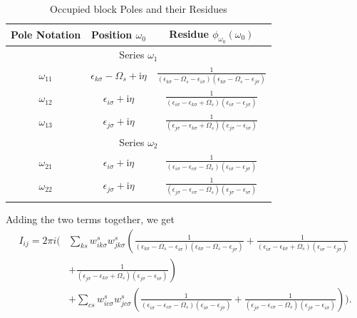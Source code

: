 \documentclass[12pt]{caltech_thesis}
\begin{document}
\begin{table}[h]
\centering
\caption{Occupied block Poles and their Residues}
\begin{tabular}{|c|c|c|}
\hline
Pole Notation & Position $\omega_0$ & Residue $\phi_{\omega_0}(\omega_0)$ \\
\hline
\multicolumn{3}{|c|}{Series $\omega_1$} \\
\hline
$\omega_{11}$ & $\epsilon_{k \sigma} - \Omega_s + \mathrm{i} \eta$ & $\frac{1}{(\epsilon_{k \sigma} - \Omega_s -\epsilon_{i \sigma})(\epsilon_{k \sigma} - \Omega_s -\epsilon_{j \sigma})}$ \\
$\omega_{12}$ & $\epsilon_{i \sigma} + \mathrm{i} \eta$ & $\frac{1}{(\epsilon_{i \sigma} -\epsilon_{k \sigma}+\Omega_s)(\epsilon_{i \sigma} -\epsilon_{j \sigma})}$ \\
$\omega_{13}$ & $\epsilon_{j \sigma} + \mathrm{i} \eta$ & $\frac{1}{(\epsilon_{j \sigma} -\epsilon_{k \sigma}+\Omega_s)(\epsilon_{j \sigma} -\epsilon_{i \sigma})}$ \\
\hline
\multicolumn{3}{|c|}{Series $\omega_2$} \\
\hline
$\omega_{21}$ & $\epsilon_{i \sigma} + \mathrm{i} \eta$ & $\frac{1}{(\epsilon_{i \sigma} -\epsilon_{c \sigma}-\Omega_s)(\epsilon_{i \sigma} -\epsilon_{j \sigma})}$ \\
$\omega_{22}$ & $\epsilon_{j \sigma} + \mathrm{i} \eta$ & $\frac{1}{(\epsilon_{j \sigma} -\epsilon_{c \sigma}-\Omega_s)(\epsilon_{j \sigma} -\epsilon_{i \sigma})}$ \\
\hline
\label{tabpoles_residues_occupied}
\end{tabular}
\end{table}
Adding the two terms together, we get
\begin{equation}
\begin{aligned}
I_{ij} = 2\pi i \Bigg( & \sum_{ks} w_{i k \sigma}^s w_{j k \sigma}^s \left( \frac{1}{(\epsilon_{k \sigma} - \Omega_s - \epsilon_{i \sigma})(\epsilon_{k \sigma} - \Omega_s - \epsilon_{j \sigma})} + \frac{1}{(\epsilon_{i \sigma} - \epsilon_{k \sigma} + \Omega_s)(\epsilon_{i \sigma} - \epsilon_{j \sigma})} \right. \\
& \left. + \frac{1}{(\epsilon_{j \sigma} - \epsilon_{k \sigma} + \Omega_s)(\epsilon_{j \sigma} - \epsilon_{i \sigma})} \right) \\
& + \sum_{cs} w_{i c \sigma}^s w_{j c \sigma}^s \left( \frac{1}{(\epsilon_{i \sigma} - \epsilon_{c \sigma} - \Omega_s)(\epsilon_{i \sigma} - \epsilon_{j \sigma})} + \frac{1}{(\epsilon_{j \sigma} - \epsilon_{c \sigma} - \Omega_s)(\epsilon_{j \sigma} - \epsilon_{i \sigma})} \right) \Bigg).
\end{aligned}
\end{equation}
\end{document}
